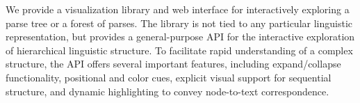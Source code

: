 We provide a visualization library and web interface for interactively exploring a parse tree or a forest of parses. The library is not tied to any particular linguistic representation, but provides a general-purpose API for the interactive exploration of hierarchical linguistic structure. To facilitate rapid understanding of a complex structure, the API offers several important features, including expand/collapse functionality, positional and color cues, explicit visual support for sequential structure, and dynamic highlighting to convey node-to-text correspondence.
